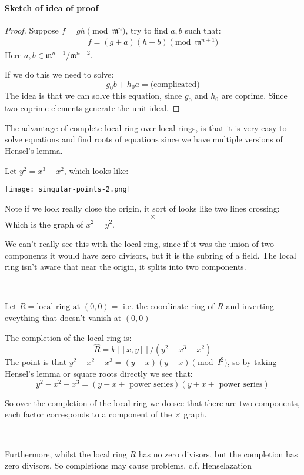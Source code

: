 \paragraph*{Sketch of idea of proof}\begin{proof}
    Suppose $f=gh\pmod \mathfrak{m}^n$, try to find $a,b$ such that:\begin{align*}
        f = (g+a)(h+b) \pmod \mathfrak{m}^{n+1}
    \end{align*}
    Here $a,b\in \mathfrak{m}^{n+1}/\mathfrak{m}^{n+2}$.

    If we do this we need to solve:\[g_0 b + h_0 a = \text{(complicated)}\]
    The idea is that we can solve this equation, since $g_0$ and $h_0$ are coprime. Since two coprime elements generate the unit ideal.
\end{proof}

The advantage of complete local ring over local rings, is that it is very easy to solve equations and find roots of equations since we have multiple versions of Hensel's lemma. 

\begin{example}
    Let $y^2=x^3+x^2$,  which looks like:
\begin{center}
    \texttt{[image: singular-points-2.png]}    
\end{center}
Note if we look really close the origin, it sort of looks like two lines crossing: \[\times\]
Which is the graph of $x^2 = y^2$.

We can't really see this with the local ring, since if it was the union of two components it would have zero divisors, but it is the subring of a field. 
The local ring isn't aware that near the origin, it splits into two components.

\

Let $R = \text{local ring at }(0,0) = $ i.e. the coordinate ring of $R$ and inverting eveything that doesn't vanish at $(0,0)$

The completion of the local ring is:\[\hat{R} = k[[x,y]]/(y^2-x^3-x^2)\]
The point is that $y^2 - x^2-x^3 = (y-x)(y+x) \pmod I^2$, so by taking Hensel's lemma or square roots directly we see that:\[y^2-x^2-x^3 = (y-x+\text{ power series})(y+x+\text{ power series})\] 


So over the completion of the local ring we do see that there are two components, each factor corresponds to a component of the $\times$ graph.

\

Furthermore, whilst the local ring $R$ has no zero divisors, but the completion has zero divisors. So completions may cause problems, c.f. Henselazation 

\end{example}

